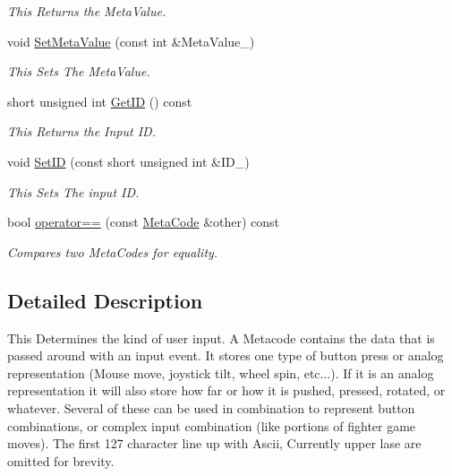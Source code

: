 \begin{DoxyCompactItemize}
\begin{DoxyCompactList}\small\item\em This Returns the MetaValue. \item\end{DoxyCompactList}\item 
void \hyperlink{classMetaCode_a1e410df95815b4d7e94b971bb1b8ba1e}{SetMetaValue} (const int \&MetaValue\_\-)
\begin{DoxyCompactList}\small\item\em This Sets The MetaValue. \item\end{DoxyCompactList}\item 
short unsigned int \hyperlink{classMetaCode_a680b5e1c2ce8d8d08d00f10187728547}{GetID} () const 
\begin{DoxyCompactList}\small\item\em This Returns the Input ID. \item\end{DoxyCompactList}\item 
void \hyperlink{classMetaCode_a0eb10030320a1fcfdda3b867b90e629f}{SetID} (const short unsigned int \&ID\_\-)
\begin{DoxyCompactList}\small\item\em This Sets The input ID. \item\end{DoxyCompactList}\item 
bool \hyperlink{classMetaCode_a296b774682a9326494e0c2d1b357ec2a}{operator==} (const \hyperlink{classMetaCode}{MetaCode} \&other) const 
\begin{DoxyCompactList}\small\item\em Compares two MetaCodes for equality. \item\end{DoxyCompactList}\end{DoxyCompactItemize}


\subsection{Detailed Description}
This Determines the kind of user input. A Metacode contains the data that is passed around with an input event. It stores one type of button press or analog representation (Mouse move, joystick tilt, wheel spin, etc...). If it is an analog representation it will also store how far or how it is pushed, pressed, rotated, or whatever. Several of these can be used in combination to represent button combinations, or complex input combination (like portions of fighter game moves). The first 127 character line up with Ascii, Currently upper lase are omitted for brevity. 

